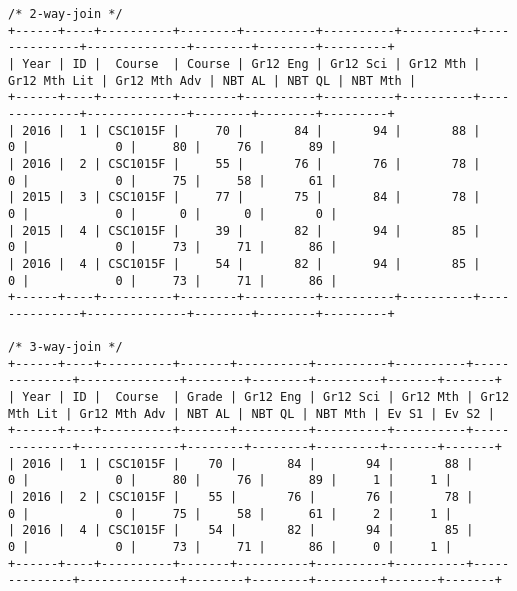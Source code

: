 \begin{sidewaysfigure}
    \centering
    \begin{mdframed}[rightline=false,leftline=false,topline=false]
        \centering
        \begin{BVerbatim}
/* 2-way-join */
+------+----+----------+--------+----------+----------+----------+--------------+--------------+--------+--------+---------+
| Year | ID |  Course  | Course | Gr12 Eng | Gr12 Sci | Gr12 Mth | Gr12 Mth Lit | Gr12 Mth Adv | NBT AL | NBT QL | NBT Mth |
+------+----+----------+--------+----------+----------+----------+--------------+--------------+--------+--------+---------+
| 2016 |  1 | CSC1015F |     70 |       84 |       94 |       88 |            0 |            0 |     80 |     76 |      89 |
| 2016 |  2 | CSC1015F |     55 |       76 |       76 |       78 |            0 |            0 |     75 |     58 |      61 |
| 2015 |  3 | CSC1015F |     77 |       75 |       84 |       78 |            0 |            0 |      0 |      0 |       0 |
| 2015 |  4 | CSC1015F |     39 |       82 |       94 |       85 |            0 |            0 |     73 |     71 |      86 |
| 2016 |  4 | CSC1015F |     54 |       82 |       94 |       85 |            0 |            0 |     73 |     71 |      86 |
+------+----+----------+--------+----------+----------+----------+--------------+--------------+--------+--------+---------+

/* 3-way-join */
+------+----+----------+-------+----------+----------+----------+--------------+--------------+--------+--------+---------+-------+-------+
| Year | ID |  Course  | Grade | Gr12 Eng | Gr12 Sci | Gr12 Mth | Gr12 Mth Lit | Gr12 Mth Adv | NBT AL | NBT QL | NBT Mth | Ev S1 | Ev S2 |
+------+----+----------+-------+----------+----------+----------+--------------+--------------+--------+--------+---------+-------+-------+
| 2016 |  1 | CSC1015F |    70 |       84 |       94 |       88 |            0 |            0 |     80 |     76 |      89 |     1 |     1 |
| 2016 |  2 | CSC1015F |    55 |       76 |       76 |       78 |            0 |            0 |     75 |     58 |      61 |     2 |     1 |
| 2016 |  4 | CSC1015F |    54 |       82 |       94 |       85 |            0 |            0 |     73 |     71 |      86 |     0 |     1 |
+------+----+----------+-------+----------+----------+----------+--------------+--------------+--------+--------+---------+-------+-------+
        \end{BVerbatim}
    \end{mdframed}
    \caption[CouchDB List output]{\textbf{Figure \ref{fig-test-list-output}: List output of CouchDB test data.} The two-way join output is achieved via the URI \texttt{http://localhost:5984/test/\_design/two-way-join/\_list/2-way-join/2-way-join.csv}. The three-way join output is achieved via the URI \texttt{http://localhost:5984/test/\_design/three-way-join/\_list/3-way-join/3-way-join.csv?group=true\&reduce=true}}
    \label{fig-test-list-output}
\end{sidewaysfigure}
